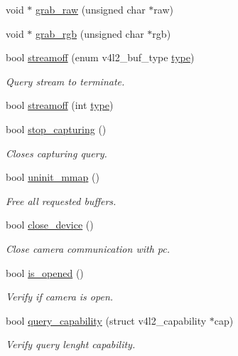 \begin{DoxyCompactItemize}
\item 
void $\ast$ \hyperlink{classv4lcap_a2974ed334916901ebfd9a59aed2428e8}{grab\+\_\+raw} (unsigned char $\ast$raw)
\item 
void $\ast$ \hyperlink{classv4lcap_a4ef7f2a17a32f5b89bf9ddce123a3b52}{grab\+\_\+rgb} (unsigned char $\ast$rgb)
\item 
bool \hyperlink{classv4lcap_ae15aa5107e993df45eb358a842d97e55}{streamoff} (enum v4l2\+\_\+buf\+\_\+type \hyperlink{classstd_1_1conditional_1_1type}{type})
\begin{DoxyCompactList}\small\item\em Query stream to terminate. \end{DoxyCompactList}\item 
bool \hyperlink{classv4lcap_a34eced9e309545a1b6bb41a41c23bc57}{streamoff} (int \hyperlink{classstd_1_1conditional_1_1type}{type})
\item 
bool \hyperlink{classv4lcap_a2992ae4b4fd36da602284c62b97cbeed}{stop\+\_\+capturing} ()
\begin{DoxyCompactList}\small\item\em Closes capturing query. \end{DoxyCompactList}\item 
bool \hyperlink{classv4lcap_aafab5fd381c1d5858cd87f42560a40ab}{uninit\+\_\+mmap} ()
\begin{DoxyCompactList}\small\item\em Free all requested buffers. \end{DoxyCompactList}\item 
bool \hyperlink{classv4lcap_adbb658a6f3248f24ee7926722e76ca43}{close\+\_\+device} ()
\begin{DoxyCompactList}\small\item\em Close camera communication with pc. \end{DoxyCompactList}\item 
bool \hyperlink{classv4lcap_a0feac915e89a04f087bce5310f8b1051}{is\+\_\+opened} ()
\begin{DoxyCompactList}\small\item\em Verify if camera is open. \end{DoxyCompactList}\item 
bool \hyperlink{classv4lcap_aff4ca1e9742c8659582810529b8c9a2c}{query\+\_\+capability} (struct v4l2\+\_\+capability $\ast$cap)
\begin{DoxyCompactList}\small\item\em Verify query lenght capability. \end{DoxyCompactList}\item 

\end{DoxyCompactItemize}
